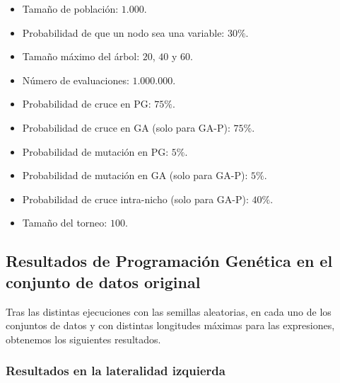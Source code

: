 \begin{itemize}
	\item Tamaño de población: $1.000$.
	\item Probabilidad de que un nodo sea una variable: $30\%$.
	\item Tamaño máximo del árbol: $20$, $40$ y $60$.
	\item Número de evaluaciones: $1.000.000$.
	\item Probabilidad de cruce en PG: $75\%$.
	\item Probabilidad de cruce en GA (solo para GA-P): $75\%$.
	\item Probabilidad de mutación en PG: $5\%$.
	\item Probabilidad de mutación en GA (solo para GA-P): $5\%$.
	\item Probabilidad de cruce intra-nicho (solo para GA-P): $40\%$.
	\item Tamaño del torneo: $100$.
\end{itemize}

\newpage

\subsection{Resultados de Programación Genética en el conjunto de datos original}

Tras las distintas ejecuciones con las semillas aleatorias, en cada uno de los conjuntos de datos y con distintas longitudes máximas para las expresiones, obtenemos los siguientes resultados.


\subsubsection{Resultados en la lateralidad izquierda}


